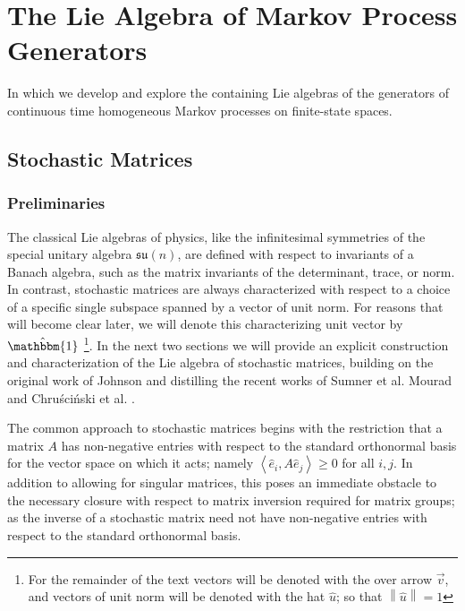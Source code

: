 \chapter{The Lie Algebra of Markov Process Generators}
In which we develop and explore the containing Lie algebras of the generators of continuous
time homogeneous Markov processes on finite-state spaces.
\section{Stochastic Matrices}
\subsection{Preliminaries}
The classical Lie algebras of physics, like the infinitesimal symmetries of the special
unitary algebra $\mathfrak{su}(n)$, are defined with respect to invariants of a Banach
algebra, such as the matrix invariants of the determinant, trace, or norm. In contrast,
stochastic matrices are always characterized with respect to a choice of a specific single
subspace spanned by a vector of unit norm. For reasons that will become clear later, we will
denote this characterizing unit vector by $\hat{\mathbbm{1}}$
\footnote{For the remainder of the text vectors will be denoted with the over arrow $\vec{v}$, and vectors of unit norm will be denoted with the hat $\hat{u}$; so that $\left\| \hat{u} \right\| = 1$}. In the next two sections we 
will provide an explicit construction and characterization of the Lie algebra of stochastic 
matrices, building on the original work of Johnson \cite{johnson_markov-type_1985} and
distilling the recent works of Sumner et al. \cite{sumner_lie_2012,fernandez-sanchez_lie_2012} 
Mourad \cite{mourad_lie-theoretic_2004} and Chruściński et al. \cite{chruscinski_pseudo-stochastic_2015}.

The common approach to stochastic matrices begins with the restriction that a matrix $A$ has 
non-negative entries with respect to the standard orthonormal basis for the vector space on 
which it acts; namely $\left\langle\hat{e}_i,A \hat{e}_j\right\rangle \ge 0$ for all $i,j$. 
In addition to allowing for singular matrices, this poses an immediate obstacle to the 
necessary closure with respect to matrix inversion required for matrix groups; as the 
inverse of a stochastic matrix need not have non-negative entries with respect to the
standard orthonormal basis. 

